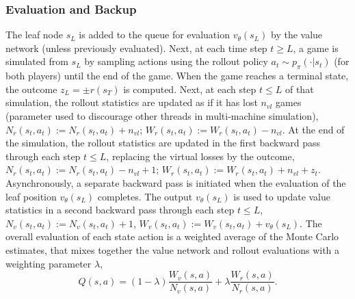 \subsubsection*{Evaluation and Backup}
The leaf node $s_L$ is added to the queue for evaluation $v_\theta(s_L)$ by the value network (unless previously evaluated). Next, at each time step $t \geq L$, a game is simulated from $s_L$ by sampling actions using the rollout policy $a_t \sim p_\pi(\cdot | s_t)$ (for both players) until the end of the game. 
When the game reaches a terminal state, the outcome $z_L = \pm r(s_T)$ is computed. 
Next, at each step $t \leq L$ of that simulation, the rollout statistics are updated as if it has lost $n_{vl}$ games (parameter used to discourage other threads in multi-machine simulation\cite{b28}), $N_r(s_t, a_t) := N_r(s_t, a_t) + n_{vl}$; $W_r(s_t, a_t) := W_r(s_t, a_t) - n_{vl}$. At the end of the simulation, the rollout statistics are updated in the first backward pass through each step $t \leq L$, replacing the virtual losses by the outcome, $N_r(s_t, a_t) := N_r(s_t, a_t) - n_{vl} + 1$; $W_r(s_t, a_t) := W_r(s_t, a_t) + n_{vl} + z_t$. Asynchronously, a separate backward pass is initiated when the evaluation of the leaf position $v_\theta(s_L)$ completes. The output $v_\theta(s_L)$ is used to update value statistics in a second backward pass through each step $t \leq L$, $N_v(s_t, a_t) := N_v(s_t, a_t) + 1$, $W_v(s_t, a_t) := W_v(s_t, a_t) + v_\theta(s_L)$. The overall evaluation of each state action is a weighted average of the Monte Carlo estimates, that mixes together the value network and rollout evaluations with a weighting parameter $\lambda$,
\begin{equation}
    Q(s,a) = (1 - \lambda)\frac{W_v(s,a)}{N_v(s,a)} + \lambda \frac{W_r(s,a)}{N_r(s,a)}.
\end{equation}


